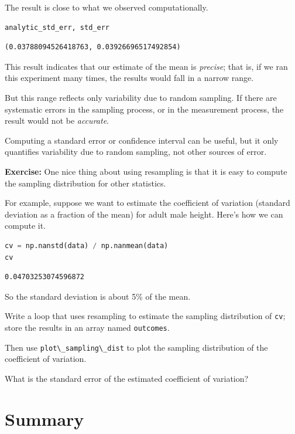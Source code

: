 The result is close to what we observed computationally.

\begin{lstlisting}[language=Python,style=source]
analytic_std_err, std_err
\end{lstlisting}

\begin{lstlisting}[style=output]
(0.03788094526418763, 0.03926696517492854)
\end{lstlisting}

This result indicates that our estimate of the mean is \emph{precise};
that is, if we ran this experiment many times, the results would fall in
a narrow range.

But this range reflects only variability due to random sampling. If
there are systematic errors in the sampling process, or in the
measurement process, the result would not be \emph{accurate}.

Computing a standard error or confidence interval can be useful, but it
only quantifies variability due to random sampling, not other sources of
error.

\textbf{Exercise:} One nice thing about using resampling is that it is
easy to compute the sampling distribution for other statistics.

For example, suppose we want to estimate the coefficient of variation
(standard deviation as a fraction of the mean) for adult male height.
Here's how we can compute it.

\begin{lstlisting}[language=Python,style=source]
cv = np.nanstd(data) / np.nanmean(data)
cv
\end{lstlisting}

\begin{lstlisting}[style=output]
0.04703253074596872
\end{lstlisting}

So the standard deviation is about 5\% of the mean.

Write a loop that uses resampling to estimate the sampling distribution
of \passthrough{\lstinline!cv!}; store the results in an array named
\passthrough{\lstinline!outcomes!}.

Then use \passthrough{\lstinline!plot\_sampling\_dist!} to plot the
sampling distribution of the coefficient of variation.

What is the standard error of the estimated coefficient of variation?

\hypertarget{summary}{%
\section{Summary}\label{summary}}

